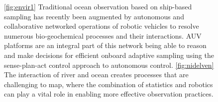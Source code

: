 \documentclass[aoas]{imsart}
\begin{document}
\begin{figure}[!h] 
  \centering 
  \hfill
  \caption{\ref{fig:envir1} Traditional ocean observation based on
    ship-based sampling has recently been augmented by autonomous and
    collaborative networked operations of robotic vehicles to resolve
    numerous bio-geochemical processes and their interactions. AUV platforms are an integral part of this network being able to reason and make decisions for efficient onboard adaptive sampling using the sense-plan-act control approach to autonomous control.
    \ref{fig:nidelven} The interaction of river and ocean creates
    processes that are challenging to map, where the combination of
    statistics and robotics can play a vital role in enabling more
    effective observation practices.}
\label{fig:envir}
\end{figure}
\end{document}
